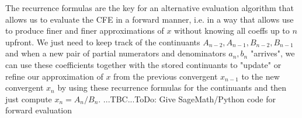 The recurrence formulas are the key for an alternative evaluation algorithm that allows us to evaluate the CFE in a forward manner, i.e. in a way that allows use to produce finer and finer approximations of $x$ without knowing all coeffs up to $n$ upfront. We just need to keep track of the continuants $A_{n-2}, A_{n-1}, B_{n-2}, B_{n-1}$ and when a new pair of partial numerators and denominators $a_n, b_n$ "arrives", we can use these coefficients together with the stored continuants to "update" or refine our approximation of $x$ from the previous convergent $x_{n-1}$ to the new convergent $x_n$ by using these recurrence formulas for the continuants and then just compute $x_n = A_n/B_n$. ...TBC...ToDo: Give SageMath/Python code for forward evaluation




%


